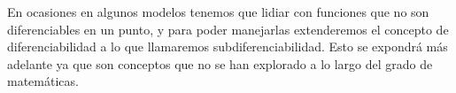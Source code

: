 En ocasiones en algunos modelos tenemos que lidiar con funciones que no son diferenciables en un punto, y para poder manejarlas extenderemos el concepto de diferenciabilidad a lo que llamaremos subdiferenciabilidad. Esto se expondrá más adelante ya que son conceptos que no se han explorado a lo largo del grado de matemáticas.



\begin{comment} %
	\begin{definicion}[Función continuamente diferenciable]
	    Si una función $f$ parcialmente derivable tiene todas sus derivadas parciales continuas, decimos que la función $f$ es continuamente diferenciable. Decimos que es de clase $C^1$.
	\end{definicion}
\end{comment}


\begin{comment}
    
	
	\begin{definicion}[Conjunto conexo]
	    Un espacio métrico $E$ es convexo si no puede ser expresado como unión de dos subconjuntos abiertos, no vacíos y disjuntos. Podemos formularlo de la siguiente manera:
	
	    $$U=U^{\circ}, V=V^{\circ}, U \cup V = E, U \cap V = \emptyset \Rightarrow U=\emptyset ó V=\emptyset$$
	\end{definicion}
	
	Caracterizamos de manera sencilla un espacio conexo:
	
	\begin{itemize}
	    \item \textit{Un espacio métrico $E$ es conexo si, y sólo si, para cualesquiera dos puntos $x,y \in E$ existe un conjunto conexo $C \subset E$, tal que $x,y \in C$}
	\end{itemize}
	
	Podemos decir de esta manera que un espacio métrico $E$ es conexo cuando cualquiera dos puntos de $E$ están conectados, es decir, existe un subconjunto conexo de E que los contiene.

\end{comment}




